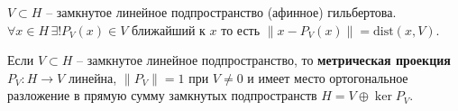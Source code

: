 
\begin{to_thr}
	$V\subset H$ -- замкнутое линейное подпространство (афинное) гильбертова. $\forall x \in H \, \exists ! P_V(x) \in V$ ближайший к $x$ то есть $\|x - P_V(x)\| = \text{dist} (x,V)$.
\end{to_thr}

\begin{to_thr}
	Если $V\subset H$ -- замкнутое линейное подпространство, то \textbf{метрическая проекция} $P_V \colon H \to V$ линейна, $\|P_V\| = 1$ при $V \neq 0$ и имеет место ортогональное разложение в прямую сумму замкнутых подпространств $H = V \oplus \ker P_V$.
\end{to_thr}